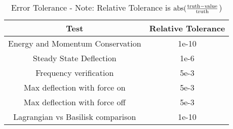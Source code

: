 \begin{table}[htbp]
	\caption{Error Tolerance - Note: Relative Tolerance is $\textnormal{abs}(\frac{\textnormal{truth} - \textnormal{value}}{\textnormal{truth}}$)}
	\label{tab:errortol}
	\centering \fontsize{10}{10}\selectfont
	\begin{tabular}{| c | c |} %
		\hline
		Test   & Relative Tolerance \\
		\hline
		Energy and Momentum Conservation & 1e-10 \\
		\hline
		Steady State Deflection & 1e-6 \\
		\hline
		Frequency verification & 5e-3 \\
		\hline
		Max deflection with force on & 5e-3 \\
		\hline
		Max deflection with force off & 5e-3 \\
		\hline
		Lagrangian vs Basilisk comparison & 1e-10 \\
		\hline	
	\end{tabular}
\end{table}

\clearpage
